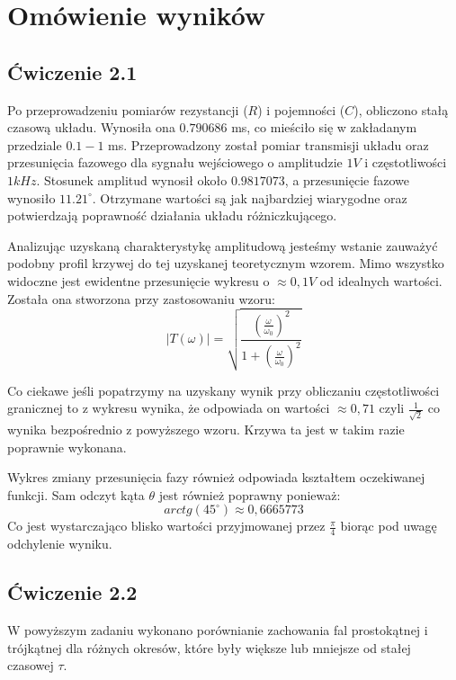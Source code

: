 \documentclass{article}
\begin{document}
  \section{Omówienie wyników}
    \subsection{Ćwiczenie 2.1}
      Po przeprowadzeniu pomiarów rezystancji ($R$) i pojemności ($C$), obliczono stałą czasową układu. Wynosiła ona $0.790686$ ms, co mieściło się w zakładanym przedziale $0.1 - 1$ ms.
      Przeprowadzony został pomiar transmisji układu oraz przesunięcia fazowego dla sygnału wejściowego o amplitudzie $1V$ i częstotliwości $1kHz$. Stosunek amplitud wynosił około $0.9817073$, a przesunięcie fazowe wynosiło $11.21^\circ$. Otrzymane wartości są jak najbardziej wiarygodne oraz potwierdzają poprawność działania układu różniczkującego.

      Analizując uzyskaną charakterystykę amplitudową jesteśmy wstanie zauważyć podobny profil krzywej do tej uzyskanej teoretycznym wzorem. Mimo wszystko widoczne jest ewidentne przesunięcie wykresu o $\approx 0,1V$ od idealnych wartości. Została ona stworzona przy zastosowaniu wzoru:
      \begin{equation}
        |T(\omega)| = \sqrt{\frac{(\frac{\omega}{\omega_0})^2}{1+(\frac{\omega}{\omega_0})^2}}
      \end{equation}

      Co ciekawe jeśli popatrzymy na uzyskany wynik przy obliczaniu częstotliwości granicznej to z wykresu wynika, że odpowiada on wartości $\approx 0,71$ czyli $\frac{1}{\sqrt{2}}$ co wynika bezpośrednio z powyższego wzoru. Krzywa ta jest w takim razie poprawnie wykonana.

      Wykres zmiany przesunięcia fazy również odpowiada kształtem oczekiwanej funkcji. Sam odczyt kąta $\theta$ jest również poprawny ponieważ:
      \begin{equation}
        arctg(45^\circ) \approx 0,6665773
      \end{equation}
      Co jest wystarczająco blisko wartości przyjmowanej przez $\frac{\pi}{4}$ biorąc pod uwagę odchylenie wyniku.

    \subsection{Ćwiczenie 2.2}
      W powyższym zadaniu wykonano porównianie zachowania fal prostokątnej i trójkątnej dla różnych okresów, które były większe lub mniejsze od stałej czasowej $\tau$.
\end{document}
